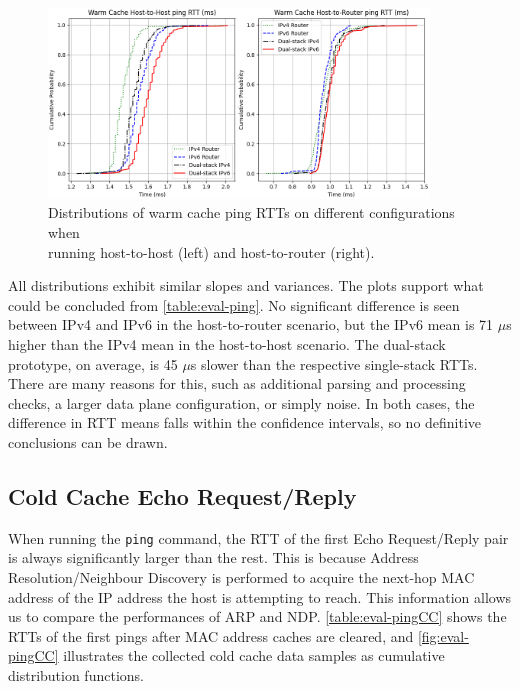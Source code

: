 \begin{figure}[htbp]
  \centering
    \includegraphics[width=0.90\textwidth]{figures/evaluation/Ping_WC.png}
     \caption{Distributions of warm cache ping RTTs on different configurations when \\ running host-to-host (left) and host-to-router (right).}
     \label{fig:eval-pingWC}
\end{figure}

All distributions exhibit similar slopes and variances. The plots support what could be concluded from \cref{table:eval-ping}. No significant difference is seen between IPv4 and IPv6 in the host-to-router scenario, but the IPv6 mean is 71 $\mu$s higher than the IPv4 mean in the host-to-host scenario. The dual-stack prototype, on average, is 45 $\mu$s slower than the respective single-stack RTTs. There are many reasons for this, such as additional parsing and processing checks, a larger data plane configuration, or simply noise. In both cases, the difference in RTT means falls within the confidence intervals, so no definitive conclusions can be drawn.



\subsection{Cold Cache Echo Request/Reply}
\label{sec:4.3.2}

When running the \texttt{ping} command, the RTT of the first Echo Request/Reply pair is always significantly larger than the rest. This is because Address Resolution/Neighbour Discovery is performed to acquire the next-hop MAC address of the IP address the host is attempting to reach. This information allows us to compare the performances of ARP and NDP. \cref{table:eval-pingCC} shows the RTTs of the first pings after MAC address caches are cleared, and \cref{fig:eval-pingCC} illustrates the collected cold cache data samples as cumulative distribution functions.


